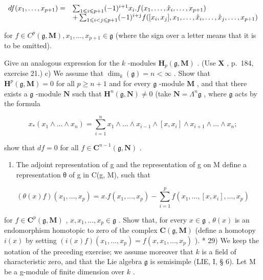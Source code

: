 \[
\begin{array}{r l} d f (x _ {1}, \dots , x _ {p + 1}) = & \sum_ {1 \leqslant i \leqslant p + 1} (- 1) ^ {i + 1} x _ {i}. f (x _ {1}, \dots , \hat {x} _ {i}, \dots , x _ {p + 1}) \\ & + \sum_ {1 \leqslant i <   j \leqslant p + 1} (- 1) ^ {i + j} f ([ x _ {i}, x _ {j} ], x _ {1}, \dots , \hat {x} _ {i}, \dots , \hat {x} _ {j}, \dots , x _ {p + 1}) \end{array}
\]

for \(f \in C^{p}(\mathfrak{g}, \mathbf{M}), x_{1}, \ldots, x_{p+1} \in \mathfrak{g}\) (where the sign over a letter means that it is to be omitted).

Give an analogous expression for the \(k\) -modules \(\mathbf{H}_p(\mathfrak{g}, \mathbf{M})\) . (Use \(\mathbf{X}\) , p.~184, exercise 21.) c) We assume that \(\dim_k(\mathfrak{g}) = n < \infty\) . Show that \(\mathbf{H}^p(\mathfrak{g}, \mathbf{M}) = 0\) for all \(p \geqslant n + 1\) and for every \(\mathfrak{g}\) -module \(\mathbf{M}\) , and that there exists a \(\mathfrak{g}\) -module \(\mathbf{N}\) such that \(\mathbf{H}^n(\mathfrak{g}, \mathbf{N}) \neq 0\) (take \(\mathbf{N} = \Lambda^n\mathfrak{g}\) , where \(\mathfrak{g}\) acts by the formula

\[
x _ {*} \left(x _ {1} \wedge \dots \wedge x _ {n}\right) = \sum_ {i = 1} ^ {n} x _ {1} \wedge \dots \wedge x _ {i - 1} \wedge [ x, x _ {i} ] \wedge x _ {i + 1} \wedge \dots \wedge x _ {n};
\]

show that \(df = 0\) for all \(f \in \mathbf{C}^{n-1}(\mathfrak{g}, \mathbf{N})\) .

\begin{enumerate}
\def\labelenumi{\alph{enumi})}
\setcounter{enumi}{3}
\tightlist
\item
  The adjoint representation of g and the representation of g on M define a representation θ of g in C(g, M), such that
\end{enumerate}

\[
\left(\theta (x) f\right) \left(x _ {1}, \dots , x _ {p}\right) = x. f (x _ {1}, \dots , x _ {p}) - \sum_ {i = 1} ^ {p} f (x _ {1}, \dots , [ x, x _ {i} ], \dots , x _ {p})
\]

for \(f \in \mathbf{C}^p(\mathfrak{g}, \mathbf{M})\) , \(x, x_1, \ldots, x_p \in \mathfrak{g}\) . Show that, for every \(x \in \mathfrak{g}\) , \(\theta(x)\) is an endomorphism homotopic to zero of the complex \(\mathbf{C}(\mathfrak{g}, \mathbf{M})\) (define a homotopy \(i(x)\) by setting \((i(x) f) (x_1, \ldots, x_p) = f(x, x_1, \ldots, x_p)\) ). * 29) We keep the notation of the preceding exercise; we assume moreover that \(k\) is a field of characteristic zero, and that the Lie algebra \(\mathfrak{g}\) is semisimple (LIE, I, § 6). Let M be a g-module of finite dimension over \(k\) .

